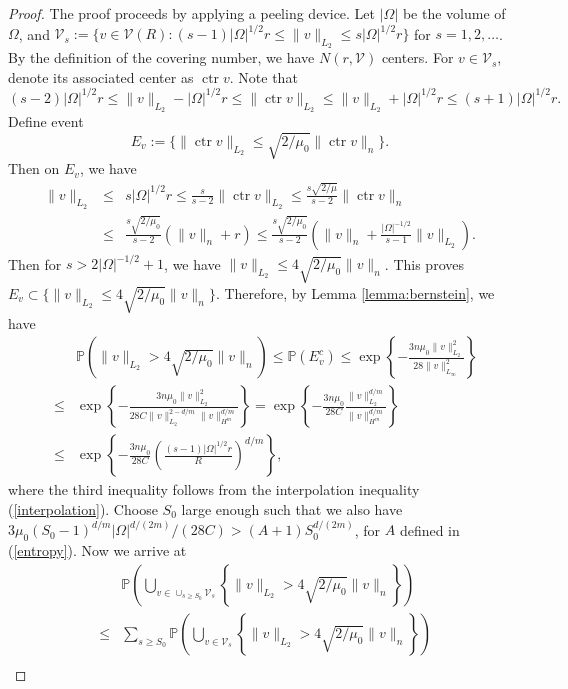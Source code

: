 \documentclass[10pt,a4paper]{amsart}
\begin{document}
\begin{proof}
    The proof proceeds by applying a peeling device.
    Let $|\Omega|$ be the volume of $\Omega$, and $\mathcal{V}_s:=\{v\in\mathcal{V}(R):(s-1)|\Omega|^{1/2}r \leq \|v\|_{L_2}\leq s |\Omega|^{1/2}r\}$ for $s=1,2,\ldots$. By the definition of the covering number, we have $N(r,\mathcal{V})$ centers. For $v\in\mathcal{V}_s$, denote its associated center as $\operatorname{ctr}v$. Note that
    \[(s-2)|\Omega|^{1/2}r\leq\|v\|_{L_2}-|\Omega|^{1/2}r\leq \|\operatorname{ctr}v\|_{L_2}\leq\|v\|_{L_2}+|\Omega|^{1/2}r\leq (s+1)|\Omega|^{1/2}r.\] Define event
    \[E_v:=\{\|\operatorname{ctr}v\|_{L_2}\leq \sqrt{2/\mu_0}\|\operatorname{ctr}v\|_n\}.\]
    Then on $E_v$, we have 
    \begin{eqnarray*}
        \|v\|_{L_2}&\leq& s|\Omega|^{1/2}r\leq \frac{s}{s-2}\|\operatorname{ctr}v\|_{L_2}\leq \frac{s\sqrt{2/\mu}}{s-2}\|\operatorname{ctr}v\|_n\\
        &\leq&\frac{s\sqrt{2/\mu_0}}{s-2}(\|v\|_n+r)\leq \frac{s\sqrt{2/\mu_0}}{s-2}\left(\|v\|_n+\frac{|\Omega|^{-1/2}}{s-1}\|v\|_{L_2}\right).
    \end{eqnarray*}
    Then for $s> 2|\Omega|^{-1/2}+1$, we have $\|v\|_{L_2}\leq 4\sqrt{2/\mu_0}\|v\|_n$. This proves $E_v\subset \{\|v\|_{L_2}\leq 4\sqrt{2/\mu_0}\|v\|_n\}$. Therefore, by Lemma \ref{lemma:bernstein}, we have
    \begin{eqnarray*}
    &&\mathbb{P}(\|v\|_{L_2}> 4\sqrt{2/\mu_0}\|v\|_n)\leq \mathbb{P}(E_v^c)\leq \exp\left\{-\frac{3n\mu_0\|v\|^2_{L_2}}{28\|v\|^2_{L_\infty}}\right\}\\
    &\leq&\exp\left\{-\frac{3n\mu_0\|v\|^2_{L_2}}{28C\|v\|^{2-d/m}_{L_2}\|v\|^{d/m}_{H^m}}\right\}=\exp\left\{-\frac{3n\mu_0}{28C}\frac{\|v\|^{d/m}_{L_2}}{\|v\|^{d/m}_{H^m}}\right\}\\
    &\leq&\exp\left\{-\frac{3n\mu_0}{28C}\left(\frac{(s-1)|\Omega|^{1/2}r}{R}\right)^{d/m}\right\},
    \end{eqnarray*}
    where the third inequality follows from the interpolation inequality (\ref{interpolation}). Choose $S_0$ large enough such that we also have $3\mu_0(S_0-1)^{d/m}|\Omega|^{d/(2m)}/(28C)>(A+1)S_0^{d/(2m)}$, for $A$ defined in (\ref{entropy}). Now we arrive at
    \begin{eqnarray*}
        &&\mathbb{P}\left(\bigcup_{v\in \cup_{s\geq S_0}\mathcal{V}_s}\left\{\|v\|_{L_2}> 4\sqrt{2/\mu_0}\|v\|_n\right\}\right)\\
        &\leq&\sum_{s\geq S_0}\mathbb{P}\left(\bigcup_{v\in \mathcal{V}_s}\left\{\|v\|_{L_2}> 4\sqrt{2/\mu_0}\|v\|_n\right\}\right)\\

\end{eqnarray*}
\end{proof}
\end{document}
